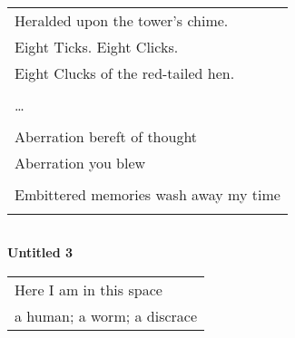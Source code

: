 \documentclass{article}
\begin{document}


\begin{center}
\begin{tabular}{l}
Heralded upon the tower's chime. \\
Eight Ticks. Eight Clicks. \\
Eight Clucks of the red-tailed hen. \\
\\
\ldots{} \\
\\
Aberration bereft of thought \\
Aberration you blew \\
\\
Embittered memories wash away my time \\
\\
\end{tabular}
\end{center}
\begin{center}
\begin{tabular}{l} %
%
\end{tabular}
\end{center}


\begin{center}
\textbf{Untitled 3} \\
\vspace*{2ex}
\begin{tabular}{l}
Here I am in this space \\
a human; a worm; a discrace \\
 
\end{tabular}
\end{center}
\end{document}
